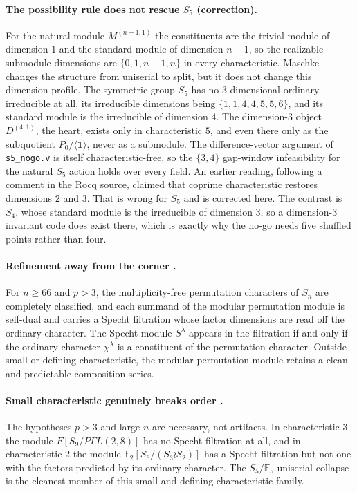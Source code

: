 \documentclass[11pt]{article}
\newcommand{\F}{\mathbb{F}}
\newcommand{\GF}[1]{\mathbb{F}_{#1}}
\newcommand{\Sym}{S}
\newcommand{\one}{\mathbf{1}}
\begin{document}
\paragraph{The possibility rule does not rescue $\Sym_5$ (correction).}
For the natural module $M^{(n-1,1)}$ the constituents are the trivial module of dimension
$1$ and the standard module of dimension $n-1$, so the realizable submodule dimensions are
$\{0,1,n-1,n\}$ in every characteristic. Maschke changes the structure from uniserial to
split, but it does not change this dimension profile. The symmetric group $\Sym_5$ has no
$3$-dimensional ordinary irreducible at all, its irreducible dimensions being
$\{1,1,4,4,5,5,6\}$, and its standard module is the irreducible of dimension $4$. The
dimension-$3$ object $D^{(4,1)}$, the heart, exists only in characteristic $5$, and even
there only as the subquotient $P_0/\langle \one\rangle$, never as a submodule. The
difference-vector argument of \texttt{s5\_nogo.v} is itself characteristic-free, so the
$\{3,4\}$ gap-window infeasibility for the natural $\Sym_5$ action holds over every field.
An earlier reading, following a comment in the Rocq source, claimed that coprime
characteristic restores dimensions $2$ and $3$. That is wrong for $\Sym_5$ and is corrected
here. The contrast is $\Sym_4$, whose standard module is the irreducible of dimension $3$,
so a dimension-$3$ invariant code does exist there, which is exactly why the no-go needs
five shuffled points rather than four.

\paragraph{Refinement away from the corner \cite{wildon2009mfree}.}
For $n \geq 66$ and $p > 3$, the multiplicity-free permutation characters of $\Sym_n$ are
completely classified, and each summand of the modular permutation module is self-dual and
carries a Specht filtration whose factor dimensions are read off the ordinary character.
The Specht module $S^\lambda$ appears in the filtration if and only if the ordinary
character $\chi^\lambda$ is a constituent of the permutation character. Outside small or
defining characteristic, the modular permutation module retains a clean and predictable
composition series.

\paragraph{Small characteristic genuinely breaks order \cite{wildon2009mfree}.}
The hypotheses $p > 3$ and large $n$ are necessary, not artifacts. In characteristic $3$
the module $F[\Sym_9/P\Gamma L(2,8)]$ has no Specht filtration at all, and in
characteristic $2$ the module $\F_2[\Sym_6/(\Sym_3 \wr \Sym_2)]$ has a Specht filtration
but not one with the factors predicted by its ordinary character. The $\Sym_5/\GF{5}$
uniserial collapse is the cleanest member of this small-and-defining-characteristic family.
\end{document}
